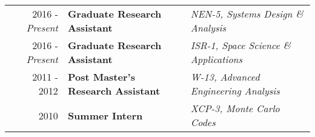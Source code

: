 

\normalsize
{}

\begin{minipage}{\textwidth}
     \begin{tabular}{r|ll}
	     2016 - \emph{Present} & \textbf{Graduate Research Assistant}  & \textit{NEN-5, Systems Design \& Analysis} \\
	     2016 - \emph{Present} & \textbf{Graduate Research Assistant} & \textit{ISR-1, Space Science \& Applications} \\
	     2011 - 2012 & \textbf{Post Master's Research Assistant}  & \textit{W-13, Advanced Engineering Analysis} \\
	     2010 & \textbf{Summer Intern} & \textit{XCP-3, Monte Carlo Codes} \\
     \end{tabular}
\end{minipage}

